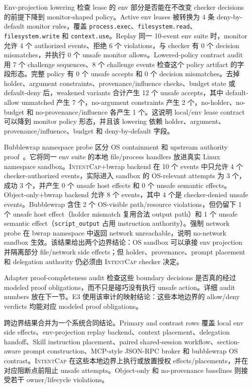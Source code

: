 \documentclass[UTF8,a4paper,11pt]{ctexart}
\newcommand{\sys}{\textsc{IntentCap}\xspace}
\begin{document}
Env-projection lowering 检查 lease 的 env 部分是否能在不改变 checker decisions 的前提下降到 monitor-shaped policy。Active env leases 被转换为 4 条 deny-by-default monitor rules，覆盖 \texttt{process.exec}、\texttt{filesystem.read}、\texttt{filesystem.write} 和 \texttt{context.use}。Replay 同一 10-event env suite 时，monitor 允许 4 个 authorized events、拒绝 6 个 violations，与 checker 有 0 个 decision mismatches，并执行 0 个 unsafe monitor allows。Lowered-policy contract audit 用 7 个 challenge sequences、8 个 challenge events 检查这个 policy artifact 的字段形态。完整 policy 有 0 个 unsafe accepts 和 0 个 decision mismatches。去掉 holder、argument constraints、provenance/influence checks、budget state 或 default-deny 后，weakened variants 合计产生 12 个 unsafe accepts，其中 default-allow unmatched 产生 7 个，no-argument constraints 产生 2 个，no-holder、no-budget 和 no-provenance/influence 各产生 1 个。这说明 local/env lease contract 可以降到 monitor policy 形态，并且该 lowering 依赖 holder、argument、provenance/influence、budget 和 deny-by-default 字段。

Bubblewrap namespace probe 区分 OS containment 和 upstream authority proof~\cite{bubblewrap}。它将同一 env suite 的本地 file/process handlers 放进真实 Linux namespace sandbox。\sys+bwrap backend 在 10 个 events 中只允许 4 个 checker-authorized events，实际进入 sandbox 的 OS-relevant attempts 为 3 个，成功 3 个，并产生 0 个 unsafe host effects 和 0 个 unsafe semantic effects。Object-only+bwrap backend 允许 8 个 events，其中 4 个是 checker-denied unsafe events。Bubblewrap 含住 2 个 OS-visible path/resource violations，但仍留下 1 个 unsafe host effect（holder mismatch 复用合法 output path）和 1 个 unsafe semantic effect（\texttt{script\_output} 占用 instruction authority）。强制 network probe 在 bwrap namespace 中返回 network unreachable，说明 no-network sandbox 生效。该结果给出两个边界结论：OS sandbox 可以承接 env projection 并隔离部分 file/network side effects；但 holder、provenance、prompt placement 和 delegation authority 仍必须由 \sys checker 决定。

Adapter proof-completeness audit 检查这些 boundary decisions 是否真的经过 modeled proof obligations，而不只是碰巧没有执行 unsafe action。详细 audit numbers 放在下一节。E3 使用该审计的映射结论：这些本地边界的 allow/deny verdicts 均能对应 modeled proof obligations。

跨边界结果合并为一个系统合同结论。Primary and contrast rows 覆盖 local env side effects、env-projection replay backend、context placement、delegation handoff、Skill instruction placement、paired shared-session workflow、section-aware prompt construction、MCP-style JSON-RPC broker 和 bubblewrap OS contrast。\sys 在这些本地边界上执行或放置授权 effects/placements，并在对应阻断点前阻止 unsafe attempts。Object-only 和 no-provenance baselines 则接受若干 owner/lifecycle violations。
\end{document}
